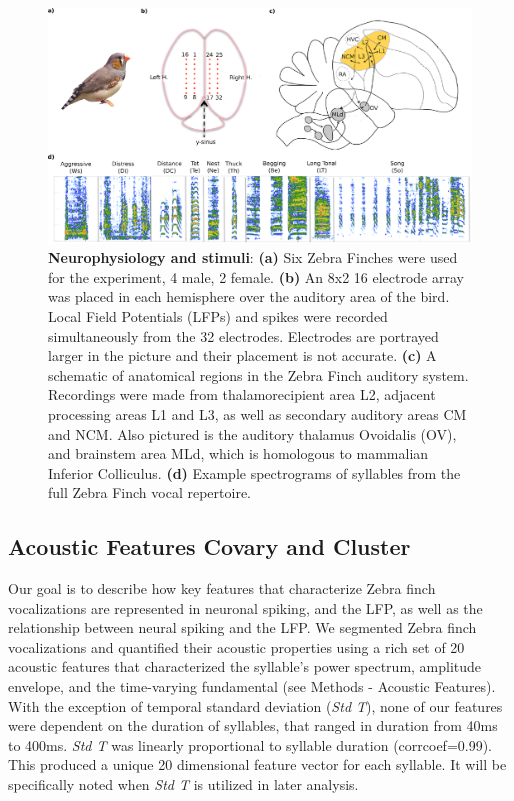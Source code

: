 \begin{figure}
    \caption{\textbf{Neurophysiology and stimuli}: \textbf{(a)} Six Zebra Finches were used for the experiment, 4 male, 2 female. \textbf{(b)} An 8x2 16 electrode array was placed in each hemisphere over the auditory area of the bird. Local Field Potentials (LFPs) and spikes were recorded simultaneously from the 32 electrodes. Electrodes are portrayed larger in the picture and their placement is not accurate. \textbf{(c)} A schematic of anatomical regions in the Zebra Finch auditory system. Recordings were made from thalamorecipient area L2, adjacent processing areas L1 and L3, as well as secondary auditory areas CM and NCM. Also pictured is the auditory thalamus Ovoidalis (OV), and brainstem area MLd, which is homologous to mammalian Inferior Colliculus. \textbf{(d)} Example spectrograms of syllables from the full Zebra Finch vocal repertoire. }
    \centering
    \includegraphics[scale=0.25]{figure1.eps}
\end{figure}

\subsection{Acoustic Features Covary and Cluster}

    Our goal is to describe how key features that characterize Zebra finch vocalizations are represented in neuronal spiking, and the LFP, as well as the relationship between neural spiking and the LFP. We segmented Zebra finch vocalizations and quantified their acoustic properties using a rich set of 20 acoustic features that characterized the syllable’s power spectrum, amplitude envelope, and the time-varying fundamental (see Methods - Acoustic Features). With the exception of temporal standard deviation ({\em Std T}), none of our features were dependent on the duration of syllables, that ranged in duration from 40ms to 400ms. {\em Std T} was linearly proportional to syllable duration (corrcoef=0.99). This produced a unique 20 dimensional feature vector for each syllable. It will be specifically noted when {\em Std T} is utilized in later analysis.

